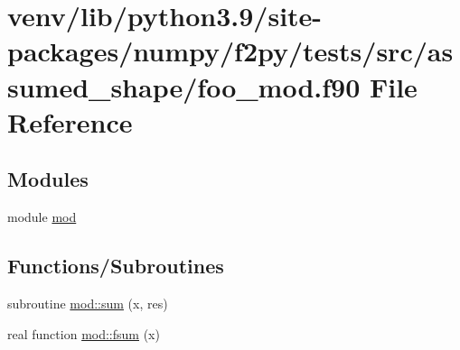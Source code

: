 \hypertarget{foo__mod_8f90}{}\section{venv/lib/python3.9/site-\/packages/numpy/f2py/tests/src/assumed\+\_\+shape/foo\+\_\+mod.f90 File Reference}
\label{foo__mod_8f90}
\subsection*{Modules}
\begin{DoxyCompactItemize}
\item 
module \hyperlink{namespacemod}{mod}
\end{DoxyCompactItemize}
\subsection*{Functions/\+Subroutines}
\begin{DoxyCompactItemize}
\item 
subroutine \hyperlink{namespacemod_a4df844757a1ca6f044e63c1312516b93}{mod\+::sum} (x, res)
\item 
real function \hyperlink{namespacemod_a9aceda52f5106b41e537f39657d081ed}{mod\+::fsum} (x)
\end{DoxyCompactItemize}

